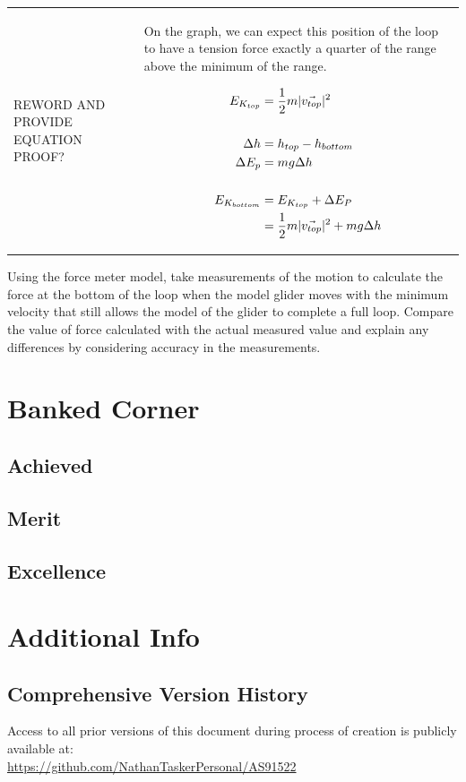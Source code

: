 \documentclass[11pt, a4paper]{article}
\begin{document}
\begin{table}[H]
\begin{tabularx}{\textwidth}{|>{\raggedright\arraybackslash}X|||>{\raggedright\arraybackslash}X|}
			\vspace{\baselineskip}
			REWORD AND PROVIDE EQUATION PROOF?
			&
			On the graph, we can expect this position of the loop to have a tension force exactly a quarter of the range above the minimum of the range. 
			\parbox{0.45\textwidth}{
				\begin{align}
					E_{K_{top}}&=\frac{1}{2}m|\vec{v_{top}}|^2\\[\baselineskip]
					\Delta h&=h_{top}-h_{bottom}\\
					\Delta E_p&=mg\Delta h\\[\baselineskip]
					E_{K_{bottom}}&=E_{K_{top}}+\Delta E_P\\
					&=\frac{1}{2}m|\vec{v_{top}}|^2+mg\Delta h
				\end{align}
			}\\
			\hline
		\end{tabularx}
	\end{table}
	
	Using the force meter model, take measurements of the motion to calculate the force at the bottom of the loop when the model glider moves with the minimum velocity that still allows the model of the glider to complete a full loop.
	Compare the value of force calculated with the actual measured value and explain any differences by considering accuracy in the measurements.
	
	
	\section{Banked Corner}
	\subsection{Achieved}
	\subsection{Merit}
	\subsection{Excellence}
	\section{Additional Info}
	\subsection{Comprehensive Version History}
	Access to all prior versions of this document during process of creation is publicly available at:\\
	\url{https://github.com/NathanTaskerPersonal/AS91522}
\end{document}
